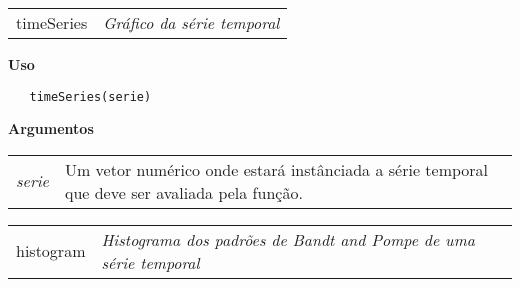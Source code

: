 \newpage

\hrulefill   

\begin{table}[!ht]
\begin{center}
\begin{tabularx}{\textwidth}{ X X}
\hspace{0.5cm} timeSeries & \textit{Gráfico da série temporal}\\
\end{tabularx}
\end{center}
\end{table} 

\vspace{-0.5cm}

\hrulefill  

\vspace{0.5cm}

\textbf{Uso}

\begin{lstlisting}
   timeSeries(serie)
\end{lstlisting}

\vspace{0.5cm}

\textbf{Argumentos}

\begin{table}[!ht]
\begin{center}
\begin{tabularx}{\textwidth}{X X}
\hspace{0.5cm} \textit{serie} & Um vetor numérico onde estará instânciada a série temporal que deve ser avaliada pela função.\\
\end{tabularx}
\end{center}
\end{table} 

\hrulefill   

\begin{table}[!ht]
\begin{center}
\begin{tabularx}{\textwidth}{ X X}
\hspace{0.5cm} histogram & \textit{Histograma dos padrões de Bandt and Pompe de uma série temporal}\\
\end{tabularx}
\end{center}
\end{table} 


